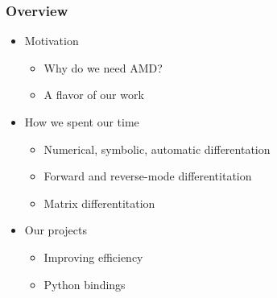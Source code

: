 



\begin{frame}
\frametitle{Overview}
%
\begin{itemize}
\item Motivation
  \begin{itemize}
  \item Why do we need AMD?
  \item A flavor of our work
  \end{itemize}
\item How we spent our time
  \begin{itemize}
    \item Numerical, symbolic, automatic differentation
    \item Forward and reverse-mode differentitation
    \item Matrix differentitation
  \end{itemize}
\item Our projects
  \begin{itemize}
  \item Improving efficiency
  \item Python bindings
  \end{itemize}
\end{itemize}
%
\end{frame}











